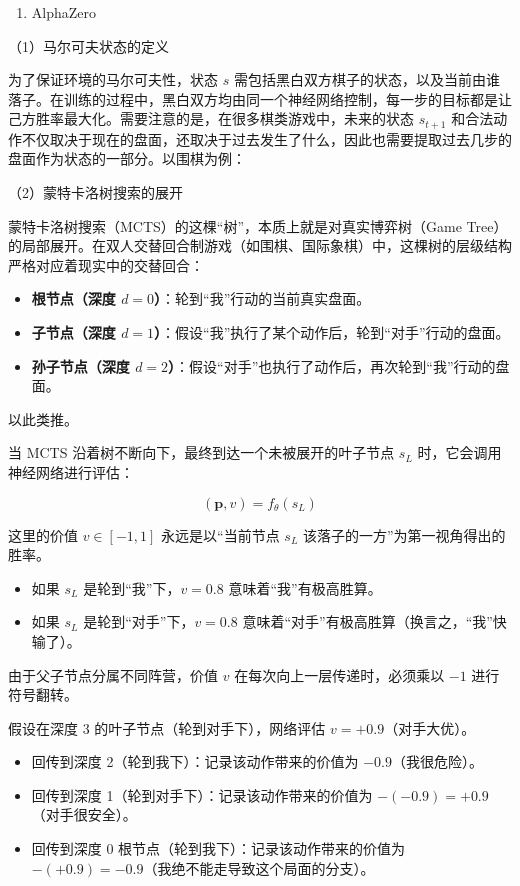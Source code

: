 \begin{enumerate}
\def\labelenumi{\arabic{enumi}.}
\setcounter{enumi}{1}
\tightlist
\item
  AlphaZero
\end{enumerate}

（1）马尔可夫状态的定义

为了保证环境的马尔可夫性，状态 \(s\) 需包括黑白双方棋子的状态，以及当前由谁落子。在训练的过程中，黑白双方均由同一个神经网络控制，每一步的目标都是让己方胜率最大化。需要注意的是，在很多棋类游戏中，未来的状态 \(s_{t+1}\) 和合法动作不仅取决于现在的盘面，还取决于过去发生了什么，因此也需要提取过去几步的盘面作为状态的一部分。以围棋为例：

（2）蒙特卡洛树搜索的展开

蒙特卡洛树搜索（MCTS）的这棵``树''，本质上就是对真实博弈树（Game Tree）的局部展开。在双人交替回合制游戏（如围棋、国际象棋）中，这棵树的层级结构严格对应着现实中的交替回合：

\begin{itemize}
\tightlist
\item
  \textbf{根节点（深度 \(d=0\)）}：轮到``我''行动的当前真实盘面。
\item
  \textbf{子节点（深度 \(d=1\)）}：假设``我''执行了某个动作后，轮到``对手''行动的盘面。
\item
  \textbf{孙子节点（深度 \(d=2\)）}：假设``对手''也执行了动作后，再次轮到``我''行动的盘面。
\end{itemize}

以此类推。

当 MCTS 沿着树不断向下，最终到达一个未被展开的叶子节点 \(s_L\) 时，它会调用神经网络进行评估：

\[
(\mathbf{p},v)=f_\theta(s_L)
\]

这里的价值 \(v\in[-1,1]\) 永远是以``当前节点 \(s_L\) 该落子的一方''为第一视角得出的胜率。

\begin{itemize}
\tightlist
\item
  如果 \(s_L\) 是轮到``我''下，\(v=0.8\) 意味着``我''有极高胜算。
\item
  如果 \(s_L\) 是轮到``对手''下，\(v=0.8\) 意味着``对手''有极高胜算（换言之，``我''快输了）。
\end{itemize}

由于父子节点分属不同阵营，价值 \(v\) 在每次向上一层传递时，必须乘以 \(-1\) 进行符号翻转。

假设在深度 3 的叶子节点（轮到对手下），网络评估 \(v=+0.9\)（对手大优）。

\begin{itemize}
\tightlist
\item
  回传到深度 2（轮到我下）：记录该动作带来的价值为 \(-0.9\)（我很危险）。
\item
  回传到深度 1（轮到对手下）：记录该动作带来的价值为 \(-(-0.9)=+0.9\)（对手很安全）。
\item
  回传到深度 0 根节点（轮到我下）：记录该动作带来的价值为 \(-(+0.9)=-0.9\)（我绝不能走导致这个局面的分支）。
\end{itemize}

